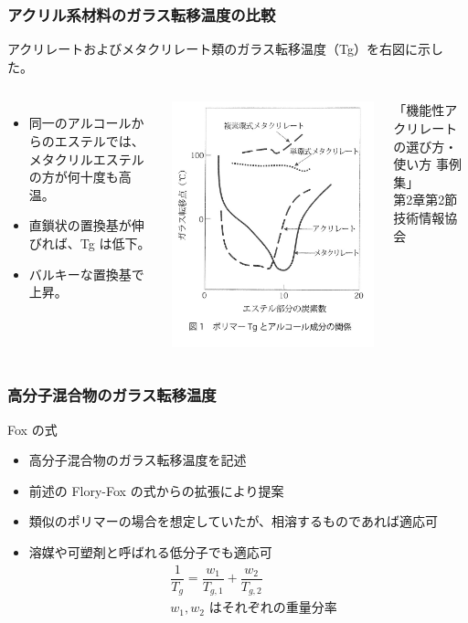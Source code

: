 \documentclass[12pt, dvipdfmx]{beamer}
\begin{document}
\begin{frame}
	\frametitle{アクリル系材料のガラス転移温度の比較}
	アクリレートおよびメタクリレート類のガラス転移温度（Tg）を右図に示した。
		\begin{columns}[T, onlytextwidth]
				\begin{itemize}
					\item 同一のアルコールからのエステルでは、メタクリルエステルの方が何十度も高温。
					\item 直鎖状の置換基が伸びれば、Tg は低下。
					\item バルキーな置換基で上昇。
				\end{itemize}
				\vspace{-2mm}
				\includegraphics[width=.7\textwidth]{Tg.jpg}
				\vspace{-2mm}

				\tiny
			「機能性アクリレートの選び方・使い方 事例集」\\第2章第2節 技術情報協会
		\end{columns}
\end{frame}

\begin{frame}
	\frametitle{高分子混合物のガラス転移温度}
		\begin{block}{Fox の式}
			\begin{itemize}
				\item 高分子混合物のガラス転移温度を記述
				\item 前述の Flory-Fox の式からの拡張により提案
				\item 類似のポリマーの場合を想定していたが、相溶するものであれば適応可
				\item 溶媒や可塑剤と呼ばれる低分子でも適応可
				\begin{align*}
					&\dfrac{1}{T_g} = \dfrac{w_1}{T_{g,1}} + \dfrac{w_2}{T_{g,2}}\\
					&\text{$w_1, w_2$ はそれぞれの重量分率}
				\end{align*}
			\end{itemize}
		\end{block}
\end{frame}
\end{document}
